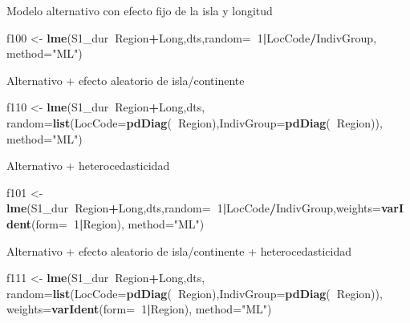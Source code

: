 \documentclass[]{article}
\newenvironment{Shaded}{\begin{snugshade}}{\end{snugshade}}
\newcommand{\DataTypeTok}[1]{\textcolor[rgb]{0.13,0.29,0.53}{#1}}
\newcommand{\DecValTok}[1]{\textcolor[rgb]{0.00,0.00,0.81}{#1}}
\newcommand{\KeywordTok}[1]{\textcolor[rgb]{0.13,0.29,0.53}{\textbf{#1}}}
\newcommand{\NormalTok}[1]{#1}
\newcommand{\OperatorTok}[1]{\textcolor[rgb]{0.81,0.36,0.00}{\textbf{#1}}}
\newcommand{\StringTok}[1]{\textcolor[rgb]{0.31,0.60,0.02}{#1}}
\begin{document}
Modelo alternativo con efecto fijo de la isla y longitud

\begin{Shaded}
\begin{Highlighting}[]
\NormalTok{f100 <-}\StringTok{ }\KeywordTok{lme}\NormalTok{(S1_dur}\OperatorTok{~}\NormalTok{Region}\OperatorTok{+}\NormalTok{Long,dts,}\DataTypeTok{random=}\OperatorTok{~}\DecValTok{1}\OperatorTok{|}\NormalTok{LocCode}\OperatorTok{/}\NormalTok{IndivGroup, }\DataTypeTok{method=}\StringTok{"ML"}\NormalTok{)}
\end{Highlighting}
\end{Shaded}

Alternativo + efecto aleatorio de isla/continente

\begin{Shaded}
\begin{Highlighting}[]
\NormalTok{f110 <-}\StringTok{ }\KeywordTok{lme}\NormalTok{(S1_dur}\OperatorTok{~}\NormalTok{Region}\OperatorTok{+}\NormalTok{Long,dts,}
     \DataTypeTok{random=}\KeywordTok{list}\NormalTok{(}\DataTypeTok{LocCode=}\KeywordTok{pdDiag}\NormalTok{(}\OperatorTok{~}\NormalTok{Region),}\DataTypeTok{IndivGroup=}\KeywordTok{pdDiag}\NormalTok{(}\OperatorTok{~}\NormalTok{Region)), }\DataTypeTok{method=}\StringTok{"ML"}\NormalTok{)}
\end{Highlighting}
\end{Shaded}

Alternativo + heterocedasticidad

\begin{Shaded}
\begin{Highlighting}[]
\NormalTok{f101 <-}\StringTok{ }\KeywordTok{lme}\NormalTok{(S1_dur}\OperatorTok{~}\NormalTok{Region}\OperatorTok{+}\NormalTok{Long,dts,}\DataTypeTok{random=}\OperatorTok{~}\DecValTok{1}\OperatorTok{|}\NormalTok{LocCode}\OperatorTok{/}\NormalTok{IndivGroup,}\DataTypeTok{weights=}\KeywordTok{varIdent}\NormalTok{(}\DataTypeTok{form=}\OperatorTok{~}\DecValTok{1}\OperatorTok{|}\NormalTok{Region), }\DataTypeTok{method=}\StringTok{"ML"}\NormalTok{)}
\end{Highlighting}
\end{Shaded}

Alternativo + efecto aleatorio de isla/continente + heterocedasticidad

\begin{Shaded}
\begin{Highlighting}[]
\NormalTok{f111 <-}
\StringTok{      }\KeywordTok{lme}\NormalTok{(S1_dur}\OperatorTok{~}\NormalTok{Region}\OperatorTok{+}\NormalTok{Long,dts,}
        \DataTypeTok{random=}\KeywordTok{list}\NormalTok{(}\DataTypeTok{LocCode=}\KeywordTok{pdDiag}\NormalTok{(}\OperatorTok{~}\NormalTok{Region),}\DataTypeTok{IndivGroup=}\KeywordTok{pdDiag}\NormalTok{(}\OperatorTok{~}\NormalTok{Region)),}
        \DataTypeTok{weights=}\KeywordTok{varIdent}\NormalTok{(}\DataTypeTok{form=}\OperatorTok{~}\DecValTok{1}\OperatorTok{|}\NormalTok{Region), }\DataTypeTok{method=}\StringTok{"ML"}\NormalTok{)}
\end{Highlighting}
\end{Shaded}
\end{document}
